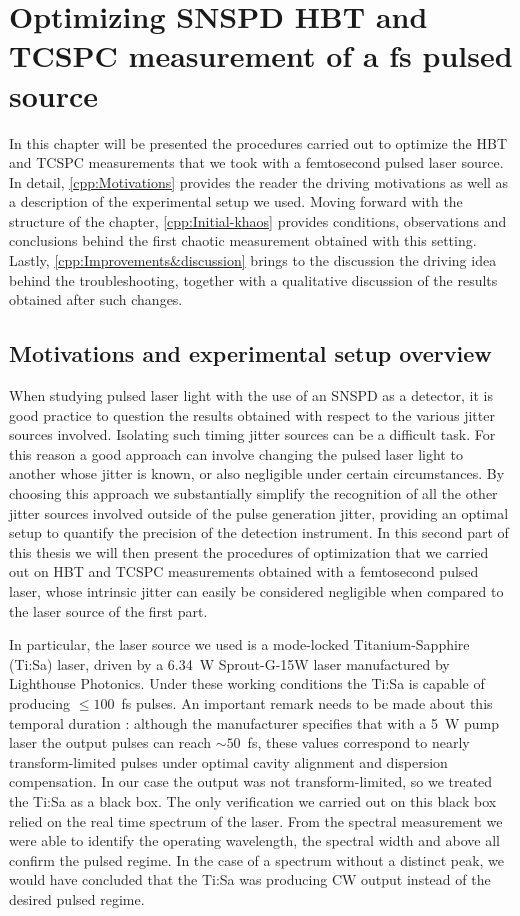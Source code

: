 \chapter{Optimizing SNSPD HBT and TCSPC measurement of a fs pulsed source}
In this chapter will be presented the procedures carried out to optimize the HBT and TCSPC measurements that we took with a femtosecond pulsed laser source.
In detail, \autoref{cpp:Motivations} provides the reader the driving motivations as well as a description of the experimental setup we used.
Moving forward with the structure of the chapter, \autoref{cpp:Initial-khaos} provides conditions, observations and conclusions behind the first chaotic measurement obtained with this setting.
Lastly, \autoref{cpp:Improvements&discussion} brings to the discussion the driving idea behind the troubleshooting, together with a qualitative discussion of the results obtained after such changes.



\section{Motivations and experimental setup overview}
\label{cpp:Motivations}
When studying pulsed laser light with the use of an SNSPD as a detector, it is good practice to question the results obtained with respect to the various jitter sources involved. Isolating such timing jitter sources can be a difficult task. For this reason a good approach can involve changing the pulsed laser light to another whose jitter is known, or also negligible under certain circumstances. By choosing this approach we substantially simplify the recognition of all the other jitter sources involved outside of the pulse generation jitter, providing an optimal setup to quantify the precision of the detection instrument. 
In this second part of this thesis we will then present the procedures of optimization that we carried out on HBT and TCSPC measurements obtained with a femtosecond pulsed laser, whose intrinsic jitter can easily be considered negligible when compared to the laser source of the first part.

In particular, the laser source we used is a mode-locked Titanium-Sapphire (Ti:Sa) laser, driven by a 6.34~W Sprout-G-15W laser manufactured by Lighthouse Photonics. Under these working conditions the Ti:Sa is capable of producing $\leq 100$~fs pulses. An important remark needs to be made about this temporal duration : although the manufacturer specifies that with a 5~W pump laser the output pulses can reach $\sim 50$~fs, these values correspond to nearly transform-limited pulses under optimal cavity alignment and dispersion compensation. In our case the output was not transform-limited, so we treated the Ti:Sa as a black box. The only verification we carried out on this black box relied on the real time spectrum of the laser. From the spectral measurement we were able to identify the operating wavelength, the spectral width and above all confirm the pulsed regime. In the case of a spectrum without a distinct peak, we would have concluded that the Ti:Sa was producing CW output instead of the desired pulsed regime.

